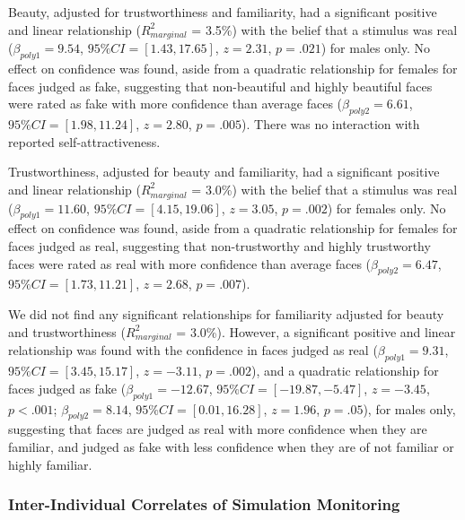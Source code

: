 \documentclass[
  man,floatsintext]{apa6}
\begin{document}
Beauty, adjusted for trustworthiness and familiarity, had a significant positive and linear relationship (\(R^2_{marginal}\) = 3.5\%) with the belief that a stimulus was real (\(\beta_{poly1} = 9.54\), \(95\% CI = [1.43, 17.65]\), \(z = 2.31\), \(p = .021\)) for males only. No effect on confidence was found, aside from a quadratic relationship for females for faces judged as fake, suggesting that non-beautiful and highly beautiful faces were rated as fake with more confidence than average faces (\(\beta_{poly2} = 6.61\), \(95\% CI = [1.98, 11.24]\), \(z = 2.80\), \(p = .005\)). There was no interaction with reported self-attractiveness.

Trustworthiness, adjusted for beauty and familiarity, had a significant positive and linear relationship (\(R^2_{marginal}\) = 3.0\%) with the belief that a stimulus was real (\(\beta_{poly1} = 11.60\), \(95\% CI = [4.15, 19.06]\), \(z = 3.05\), \(p = .002\)) for females only. No effect on confidence was found, aside from a quadratic relationship for females for faces judged as real, suggesting that non-trustworthy and highly trustworthy faces were rated as real with more confidence than average faces (\(\beta_{poly2} = 6.47\), \(95\% CI = [1.73, 11.21]\), \(z = 2.68\), \(p = .007\)).

We did not find any significant relationships for familiarity adjusted for beauty and trustworthiness (\(R^2_{marginal}\) = 3.0\%). However, a significant positive and linear relationship was found with the confidence in faces judged as real (\(\beta_{poly1} = 9.31\), \(95\% CI = [3.45, 15.17]\), \(z = -3.11\), \(p = .002\)), and a quadratic relationship for faces judged as fake (\(\beta_{poly1} = -12.67\), \(95\% CI = [-19.87, -5.47]\), \(z = -3.45\), \(p < .001\); \(\beta_{poly2} = 8.14\), \(95\% CI = [0.01, 16.28]\), \(z = 1.96\), \(p = .05\)), for males only, suggesting that faces are judged as real with more confidence when they are familiar, and judged as fake with less confidence when they are of not familiar or highly familiar.

\hypertarget{inter-individual-correlates-of-simulation-monitoring}{%
\subsubsection{Inter-Individual Correlates of Simulation Monitoring}\label{inter-individual-correlates-of-simulation-monitoring}}
\end{document}
